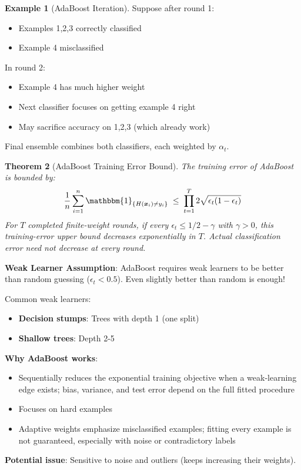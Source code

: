 \documentclass[11pt,twoside]{article}
\numberwithin{equation}{section}
\newcommand{\vect}[1]{\bm{#1}}
\newcommand{\indicator}[1]{\mathbbm{1}_{\{#1\}}}
\theoremstyle{plain}
\newtheorem{theorem}{Theorem}[section]
\theoremstyle{definition}
\newtheorem{example}[theorem]{Example}
\theoremstyle{remark}
\newenvironment{keyidea}{
  \begin{tcolorbox}[colback=yellow!5!white,
                    colframe=yellow!50!black,
                    title=Key Idea,
                    breakable,
                    enhanced,
                    sharp corners,
                    boxrule=0.8pt,
                    left=6pt, right=6pt, top=6pt, bottom=6pt]
}{
  \end{tcolorbox}
}
\begin{document}
\begin{example}[AdaBoost Iteration]
Suppose after round 1:
\begin{itemize}
\item Examples 1,2,3 correctly classified
\item Example 4 misclassified
\end{itemize}

In round 2:
\begin{itemize}
\item Example 4 has much higher weight
\item Next classifier focuses on getting example 4 right
\item May sacrifice accuracy on 1,2,3 (which already work)
\end{itemize}

Final ensemble combines both classifiers, each weighted by $\alpha_t$.
\end{example}

\begin{theorem}[AdaBoost Training Error Bound]
The training error of AdaBoost is bounded by:
\[
\frac{1}{n}\sum_{i=1}^n \indicator{H(\vect x_i)\neq y_i}
\;\leq\;
\prod_{t=1}^T 2\sqrt{\epsilon_t(1-\epsilon_t)}
\]
For $T$ completed finite-weight rounds, if every $\epsilon_t\le1/2-\gamma$ with $\gamma>0$, this training-error \emph{upper bound} decreases exponentially in $T$. Actual classification error need not decrease at every round.
\end{theorem}

\begin{keyidea}
\textbf{Weak Learner Assumption}: AdaBoost requires weak learners to be better than random guessing ($\epsilon_t < 0.5$). Even slightly better than random is enough!

Common weak learners:
\begin{itemize}
\item \textbf{Decision stumps}: Trees with depth 1 (one split)
\item \textbf{Shallow trees}: Depth 2-5
\end{itemize}

\textbf{Why AdaBoost works}:
\begin{itemize}
\item Sequentially reduces the exponential training objective when a weak-learning edge exists; bias, variance, and test error depend on the full fitted procedure
\item Focuses on hard examples
\item Adaptive weights emphasize misclassified examples; fitting every example is not guaranteed, especially with noise or contradictory labels
\end{itemize}

\textbf{Potential issue}: Sensitive to noise and outliers (keeps increasing their weights).
\end{keyidea}
\end{document}
